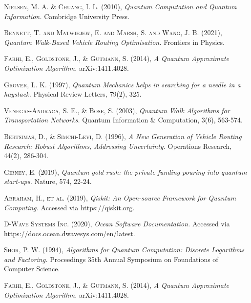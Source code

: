 \documentclass[11pt,a4paper,spanish]{book}
\begin{document}
\begin{thebibliography}{a}

	 \textsc{Nielsen, M. A. \& Chuang, I. L.} (2010),
	\textit{Quantum Computation and Quantum Information.}
	Cambridge University Press.
	
	 \textsc{Bennett, T. and Matwiejew, E. and Marsh, S. and Wang, J. B.} (2021),
	\textit{Quantum Walk-Based Vehicle Routing Optimisation.}
	Frontiers in Physics.
	
	 \textsc{Farhi, E., Goldstone, J., \& Gutmann, S.} (2014),
	\textit{A Quantum Approximate Optimization Algorithm.}
	arXiv:1411.4028.
	
	 \textsc{Grover, L. K.} (1997),
	\textit{Quantum Mechanics helps in searching for a needle in a haystack.}
	Physical Review Letters, 79(2), 325.
	
	 \textsc{Venegas-Andraca, S. E., \& Bose, S.} (2003),
	\textit{Quantum Walk Algorithms for Transportation Networks.}
	Quantum Information \& Computation, 3(6), 563-574.
	
	 \textsc{Bertsimas, D., \& Simchi-Levi, D.} (1996),
	\textit{A New Generation of Vehicle Routing Research: Robust Algorithms, Addressing Uncertainty.}
	Operations Research, 44(2), 286-304.
	
	 \textsc{Gibney, E.} (2019),
	\textit{Quantum gold rush: the private funding pouring into quantum start-ups.}
	Nature, 574, 22-24.
	
	 \textsc{Abraham, H., et al.} (2019),
	\textit{Qiskit: An Open-source Framework for Quantum Computing.}
	Accessed via https://qiskit.org.
	
	 \textsc{D-Wave Systems Inc.} (2020),
	\textit{Ocean Software Documentation.}
	Accessed via https://docs.ocean.dwavesys.com/en/latest.
	
		
	 \textsc{Shor, P. W.} (1994),
	\textit{Algorithms for Quantum Computation: Discrete Logarithms and Factoring.}
	Proceedings 35th Annual Symposium on Foundations of Computer Science.
	
	 \textsc{Farhi, E., Goldstone, J., \& Gutmann, S.} (2014),
	\textit{A Quantum Approximate Optimization Algorithm.}
	arXiv:1411.4028.
	

\end{thebibliography}
\end{document}
